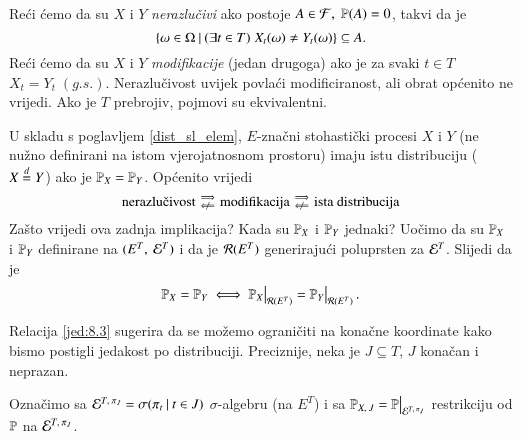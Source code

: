 \begin{nap}
\begin{enumerate}[label=(\alph*)]
        Re\' ci \' cemo da su $X$ i $Y$ \emph{nerazlu\v civi} ako postoje $A \in \mathcal{F}, \; \mathbb{P}({A}) = 0$, takvi da je
        \begin{equation*}
            \{{\omega \in \Omega} \: | \: {(\exists t \in T) \; X_t (\omega) \neq Y_t (\omega)}\} \subseteq A.
        \end{equation*}
        Re\' ci \' cemo da su $X$ i $Y$ \emph{modifikacije} (jedan drugoga) ako je za svaki $t \in T$ $X_t = Y_t \; (g.s.)$.
        Nerazlu\v civost uvijek povla\' ci modificiranost, ali obrat op\' cenito ne vrijedi.
        Ako je $T$ prebrojiv, pojmovi su ekvivalentni.
    \end{enumerate}
\end{nap}

U skladu s poglavljem \ref{dist_sl_elem}, $E$-zna\v cni stohasti\v cki procesi $X$ i $Y$ (ne nu\v zno definirani na istom vjerojatnosnom prostoru) imaju istu distribuciju ($X \overset{d}{=} Y$) ako je $\mathbb{P}_X = \mathbb{P}_Y$.
Op\' cenito vrijedi
\begin{equation*}
    \textnormal{nerazlu\v civost}
    \begin{smallmatrix}
        \implies\\
        \notimpliedby
    \end{smallmatrix}
    \textnormal{modifikacija}
    \begin{smallmatrix}
        \implies\\
        \notimpliedby
    \end{smallmatrix}
    \textnormal{ista distribucija}
\end{equation*}
Za\v sto vrijedi ova zadnja implikacija?
Kada su $\mathbb{P}_X$ i $\mathbb{P}_Y$ jednaki?
Uo\v cimo da su $\mathbb{P}_X$ i $\mathbb{P}_Y$ definirane na $({E^T}, \: {\mathcal{E}^T})$ i da je $\mathcal{R}({E^T})$ generiraju\' ci poluprsten za $\mathcal{E}^T$.
Slijedi da je
\begin{equation}    \label{jed:8.3}
    \masP_X = \masP_Y
    \iff
    \restr{\masP_X}{\prsten{E^T}} = \restr{\masP_Y}{\prsten{E^T}}.
\end{equation}

Relacija \eqref{jed:8.3} sugerira da se mo\v zemo ograni\v citi na kona\v cne koordinate kako bismo postigli jedakost po distribuciji.
Preciznije, neka je $J \subseteq T$, $J$ kona\v can i neprazan.

\begin{defn}
    Ozna\v cimo sa $\mathcal{E}^{T, \: \pi_J} = \sigma({\pi_t} \: | \: {t \in J})$ $\sigma$-algebru (na $E^T$) i sa $\masP_{X, \: J} = \restr{\masP}{\famE^{T, \: \pi_J}}$ restrikciju od $\mathbb{P}$ na $\mathcal{E}^{T, \: \pi_J}$.
\end{defn}

